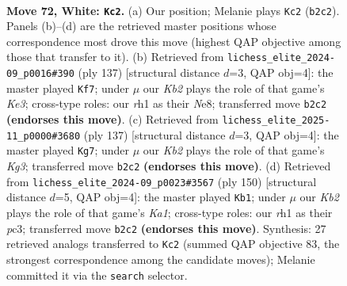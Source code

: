 \documentclass[11pt]{article}
\begin{document}
\clearpage

\begin{figure}[p]\centering
\begin{subfigure}{0.46\textwidth}\centering
\resizebox{\linewidth}{!}{%
\newchessgame
\chessboard[
  setfen={8/8/3k4/2pp4/p7/8/1K6/7r w - - 0 72},
  showmover=false,
  pgfstyle=straightmove, color=movearrow, markmove={b2-c2}
]}
\caption{}
\end{subfigure}\hfill
\begin{subfigure}{0.46\textwidth}\centering
\resizebox{\linewidth}{!}{%
\newchessgame
\chessboard[
  setfen={4n3/8/4k3/6PP/4P1K1/8/8/8 b - - 2 69},
  showmover=false,
  pgfstyle=straightmove, color=movearrow, markmove={e6-f7}
]}
\caption{}
\end{subfigure}
\\[4pt]
\begin{subfigure}{0.46\textwidth}\centering
\resizebox{\linewidth}{!}{%
\newchessgame
\chessboard[
  setfen={8/8/6k1/R7/5PP1/5K2/8/8 b - - 2 69},
  showmover=false,
  pgfstyle=straightmove, color=movearrow, markmove={g6-g7}
]}
\caption{}
\end{subfigure}\hfill
\begin{subfigure}{0.46\textwidth}\centering
\resizebox{\linewidth}{!}{%
\newchessgame
\chessboard[
  setfen={8/8/8/8/k7/ppp5/8/K7 w - - 0 76},
  showmover=false,
  pgfstyle=straightmove, color=movearrow, markmove={a1-b1}
]}
\caption{}
\end{subfigure}
\caption{\textbf{Move 72, White: \texttt{Kc2}.} (a) Our position; Melanie plays \texttt{Kc2} (\texttt{b2c2}). Panels (b)--(d) are the retrieved master positions whose correspondence most drove this move (highest QAP objective among those that transfer to it). (b) Retrieved from \texttt{lichess\_elite\_2024-09\_p0016\#390} (ply 137) [structural distance $d$=3, QAP obj=4]: the master played \texttt{Kf7}; under $\mu$ our \emph{Kb2} plays the role of that game's \emph{Ke3}; cross-type roles: our \emph{r}h1 as their \emph{N}e8; transferred move \texttt{b2c2} \textbf{(endorses this move)}. (c) Retrieved from \texttt{lichess\_elite\_2025-11\_p0000\#3680} (ply 137) [structural distance $d$=3, QAP obj=4]: the master played \texttt{Kg7}; under $\mu$ our \emph{Kb2} plays the role of that game's \emph{Kg3}; transferred move \texttt{b2c2} \textbf{(endorses this move)}. (d) Retrieved from \texttt{lichess\_elite\_2024-09\_p0023\#3567} (ply 150) [structural distance $d$=5, QAP obj=4]: the master played \texttt{Kb1}; under $\mu$ our \emph{Kb2} plays the role of that game's \emph{Ka1}; cross-type roles: our \emph{r}h1 as their \emph{p}c3; transferred move \texttt{b2c2} \textbf{(endorses this move)}. Synthesis: 27 retrieved analogs transferred to \texttt{Kc2} (summed QAP objective 83, the strongest correspondence among the candidate moves); Melanie committed it via the \texttt{search} selector.}
\label{fig:thought-m142}
\end{figure}
\end{document}
